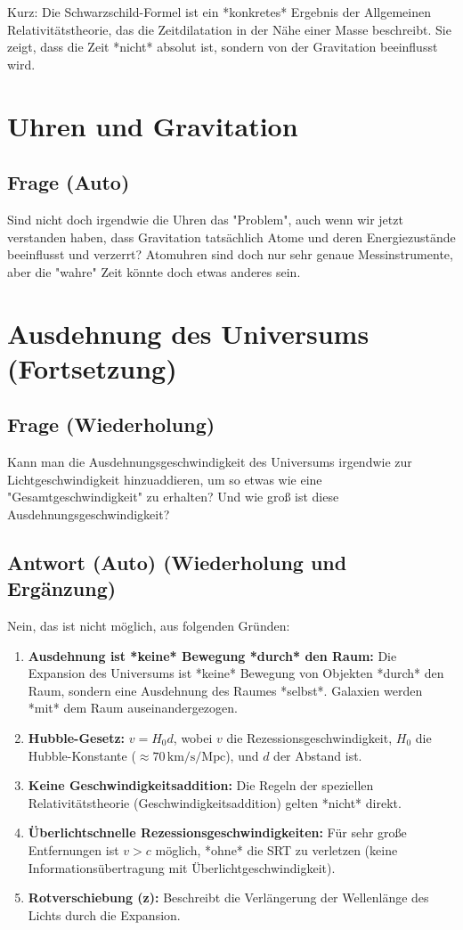 \documentclass{article}
\begin{document}
	Kurz: Die Schwarzschild-Formel ist ein *konkretes* Ergebnis der Allgemeinen Relativitätstheorie, das die Zeitdilatation in der Nähe einer Masse beschreibt. Sie zeigt, dass die Zeit *nicht* absolut ist, sondern von der Gravitation beeinflusst wird.
	
	\section{Uhren und Gravitation}
	
	\subsection{Frage (Auto)}
	Sind nicht doch irgendwie die Uhren das "Problem", auch wenn wir jetzt verstanden haben, dass Gravitation tatsächlich Atome und deren Energiezustände beeinflusst und verzerrt? Atomuhren sind doch nur sehr genaue Messinstrumente, aber die "wahre" Zeit könnte doch etwas anderes sein.
	
	\section{Ausdehnung des Universums (Fortsetzung)}
	
	\subsection{Frage (Wiederholung)}
	Kann man die Ausdehnungsgeschwindigkeit des Universums irgendwie zur Lichtgeschwindigkeit hinzuaddieren, um so etwas wie eine "Gesamtgeschwindigkeit" zu erhalten? Und wie groß ist diese Ausdehnungsgeschwindigkeit?
	
	\subsection{Antwort (Auto) (Wiederholung und Ergänzung)}
	Nein, das ist nicht möglich, aus folgenden Gründen:
	
	\begin{enumerate}
		\item \textbf{Ausdehnung ist *keine* Bewegung *durch* den Raum:} Die Expansion des Universums ist *keine* Bewegung von Objekten *durch* den Raum, sondern eine Ausdehnung des Raumes *selbst*. Galaxien werden *mit* dem Raum auseinandergezogen.
		\item \textbf{Hubble-Gesetz:}  \(v = H_0 d\), wobei \(v\) die Rezessionsgeschwindigkeit, \(H_0\) die Hubble-Konstante (\(\approx 70 \, \text{km/s/Mpc}\)), und \(d\) der Abstand ist.
		\item \textbf{Keine Geschwindigkeitsaddition:} Die Regeln der speziellen Relativitätstheorie (Geschwindigkeitsaddition) gelten *nicht* direkt.
		\item \textbf{Überlichtschnelle Rezessionsgeschwindigkeiten:} Für sehr große Entfernungen ist \(v > c\) möglich, *ohne* die SRT zu verletzen (keine Informationsübertragung mit Überlichtgeschwindigkeit).
		\item \textbf{Rotverschiebung (z):} Beschreibt die Verlängerung der Wellenlänge des Lichts durch die Expansion.
	\end{enumerate}
	
\end{document}
